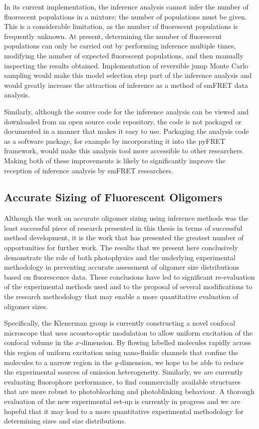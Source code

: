 In its current implementation, the inference analysis cannot infer the number of fluorescent populations in a mixture; the number of populations must be given. This is a considerable limitation, as the number of fluorescent populations is frequently unknown. At present, determining the number of fluorescent populations can only be carried out by performing inference multiple times, modifying the number of expected fluorescent populations, and then manually inspecting the results obtained. Implementation of reversible jump Monte Carlo sampling would make this model selection step part of the inference analysis and would greatly increase the attraction of inference as a method of smFRET data analysis. 

Similarly, although the source code for the inference analysis can be viewed and downloaded from an open source code repository, the code is not packaged or documented in a manner that makes it easy to use. Packaging the analysis code as a software package, for example by incorporating it into the pyFRET framework, would make this analysis tool more accessible to other researchers. Making both of these improvements is likely to significantly improve the reception of inference analysis by smFRET researchers.

\subsection{Accurate Sizing of Fluorescent Oligomers}
Although the work on accurate oligomer sizing using inference methods was the least successful piece of research presented in this thesis in terms of successful method development, it is the work that has presented the greatest number of opportunities for further work. The results that we present here conclusively demonstrate the role of both photophysics and the underlying experimental methodology in preventing accurate assessment of oligomer size distributions based on fluorescence data. These conclusions have led to significant re-evaluation of the experimental methods used and to the proposal of several modifications to the research methodology that may enable a more quantitative evaluation of oligomer sizes.

Specifically, the Klenerman group is currently constructing a novel confocal microscope that uses acousto-optic modulation to allow uniform excitation of the confocal volume in the $x$-dimension. By flowing labelled molecules rapidly across this region of uniform excitation using nano-fluidic channels that confine the molecules to a narrow region in the $y$-dimension, we hope to be able to reduce the experimental sources of emission heterogeneity. Similarly, we are currently evaluating fluorophore performance, to find commercially available structures that are more robust to photobleaching and photoblinking behaviour. A thorough evaluation of the new experimental set-up is currently in progress and we are hopeful that it may lead to a more quantitative experimental methodology for determining sizes and size distributions.

